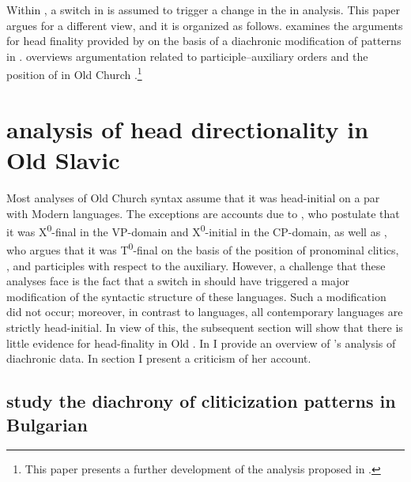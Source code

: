 \documentclass[output=paper,modfonts,newtxmath,hidelinks]{langscibook}
\begin{document}
Within , a switch in  is assumed to trigger a change in the  in  analysis. This paper argues for a different view, and it is organized as follows.  examines the arguments for head finality provided by \citet{pancheva2005} on the basis of a diachronic modification of  patterns in .  overviews  argumentation related to participle--auxiliary orders and the position of  in Old Church .\footnote{This paper presents a further development of the analysis proposed in \citet{migdalski2016}.}

\section{ analysis of head directionality in Old Slavic}\label{11:s2}

\sloppy Most analyses of Old Church  syntax \citep{willis2000,jung2015,jung-migdalski2015,migdalski2016} assume that it was head-initial on a par with Modern  languages. The exceptions are accounts due to \citet{dimitrovavulchanova-vulchanov2008}, who postulate that it was X\textsuperscript{0}{}-final in the VP-domain and X\textsuperscript{0}{}-initial in the CP-domain, as well as \citet{pancheva2005,pancheva2008}, who argues that it was T\textsuperscript{0}{}-final on the basis of the position of pronominal clitics, , and participles with respect to the auxiliary. However, a challenge that these analyses face is the fact that a switch in  should have triggered a major modification of the syntactic structure of these languages. Such a modification did not occur; moreover, in contrast to  languages, all contemporary  languages are strictly head-initial. In view of this, the subsequent section will show that there is little evidence for head-finality in Old . In  I provide an overview of \citeauthor{pancheva2005}'s analysis of diachronic  data. In section  I present a criticism of her account.

\subsection{ study the diachrony of cliticization patterns in Bulgarian}\label{11:s2.1} 
\end{document}
